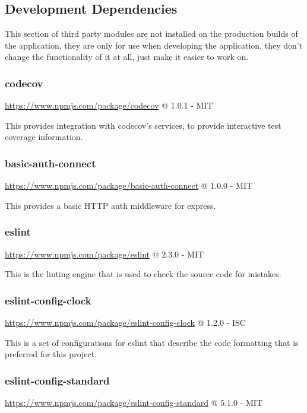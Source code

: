 \subsection{Development Dependencies}
  This section of third party modules are not installed on the production builds of the application, they are only for use when developing the application, they don't change the functionality of it at all, just make it easier to work on. 

\subsubsection*{codecov} 

\url{https://www.npmjs.com/package/codecov} @ 1.0.1 - MIT

This provides integration with codecov's services, to provide interactive test coverage information.

\subsubsection*{basic-auth-connect} 

\url{https://www.npmjs.com/package/basic-auth-connect} @ 1.0.0 - MIT

This provides a basic HTTP auth middleware for express.

\subsubsection*{eslint}  

\url{https://www.npmjs.com/package/eslint} @ 2.3.0 - MIT

This is the linting engine that is used to check the source code for mistakes.

\subsubsection*{eslint-config-clock} 

\url{https://www.npmjs.com/package/eslint-config-clock} @ 1.2.0 - ISC

This is a set of configurations for eslint that describe the code formatting that is preferred for this project.

\subsubsection*{eslint-config-standard} 

\url{https://www.npmjs.com/package/eslint-config-standard} @ 5.1.0 - MIT

